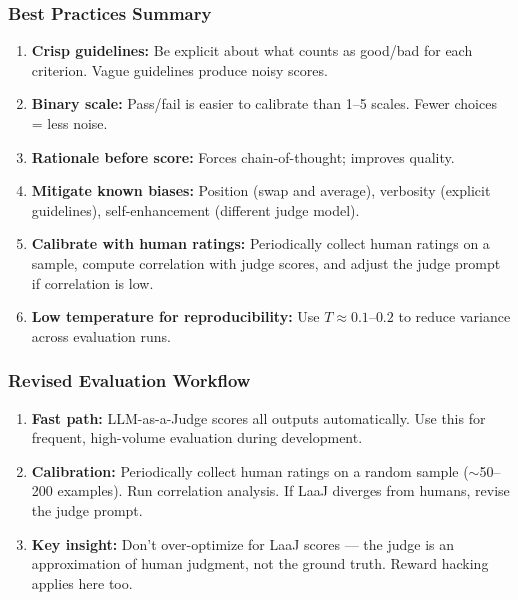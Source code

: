\documentclass[11pt, a4paper]{article}
\begin{document}
\subsubsection{Best Practices Summary}

\begin{tealbox}
\begin{enumerate}[leftmargin=1.5em]
  \item \textbf{Crisp guidelines:} Be explicit about what counts as good/bad for each criterion. Vague guidelines produce noisy scores.
  \item \textbf{Binary scale:} Pass/fail is easier to calibrate than 1--5 scales. Fewer choices = less noise.
  \item \textbf{Rationale before score:} Forces chain-of-thought; improves quality.
  \item \textbf{Mitigate known biases:} Position (swap and average), verbosity (explicit guidelines), self-enhancement (different judge model).
  \item \textbf{Calibrate with human ratings:} Periodically collect human ratings on a sample, compute correlation with judge scores, and adjust the judge prompt if correlation is low.
  \item \textbf{Low temperature for reproducibility:} Use $T \approx 0.1$--$0.2$ to reduce variance across evaluation runs.
\end{enumerate}
\end{tealbox}

\subsubsection{Revised Evaluation Workflow}

\begin{defbox}
\begin{enumerate}[leftmargin=1.5em]
  \item \textbf{Fast path:} LLM-as-a-Judge scores all outputs automatically. Use this for frequent, high-volume evaluation during development.
  \item \textbf{Calibration:} Periodically collect human ratings on a random sample ($\sim$50--200 examples). Run correlation analysis. If LaaJ diverges from humans, revise the judge prompt.
  \item \textbf{Key insight:} Don't over-optimize for LaaJ scores --- the judge is an approximation of human judgment, not the ground truth. Reward hacking applies here too.
\end{enumerate}
\end{defbox}
\end{document}

